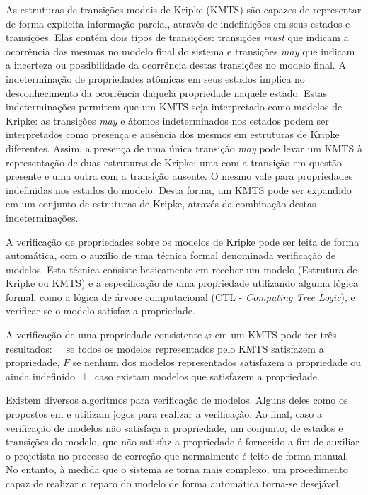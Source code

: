 \documentclass[normaltoc,capchap,capsec,times]{abnt}
\begin{document}
As estruturas de transições modais de Kripke (KMTS) são capazes de representar de forma explícita informação parcial, através de indefinições em seus estados e transições. Elas contém dois tipos de transições: transições \textit{must} que indicam a ocorrência das mesmas no modelo final do sistema e transições \textit{may} que indicam a incerteza ou possibilidade da ocorrência destas transições no modelo final. A  indeterminação de propriedades atômicas em seus estados implica no desconhecimento da ocorrência daquela propriedade naquele estado.  Estas indeterminações permitem que um KMTS seja interpretado como modelos de Kripke: as transições \textit{may} e átomos indeterminados nos estados podem ser interpretados como presença e ausência dos mesmos em estruturas de Kripke diferentes. Assim, a presença de uma única transição \textit{may} pode levar um KMTS à representação de duas estruturas de Kripke: uma com a transição em questão presente e uma outra com a transição ausente. O mesmo vale para propriedades indefinidas nos estados do modelo. Desta forma, um KMTS pode ser expandido em um conjunto de estruturas de Kripke, através da combinação destas indeterminações.


A verificação de propriedades sobre os modelos de Kripke pode ser feita de forma automática, com o auxilio de uma técnica formal denominada verificação de modelos. Esta técnica consiste basicamente em receber um modelo (Estrutura de Kripke ou KMTS) e a especificação de uma propriedade utilizando alguma lógica formal, como a lógica de árvore computacional (CTL - \textit{Computing Tree Logic}), e verificar se o modelo satisfaz a propriedade. 

A verificação de uma propriedade consistente $\varphi$ em um KMTS pode ter três resultados: $\top$ se todos os modelos representados pelo KMTS satisfazem a propriedade, $F$ se nenhum dos modelos representados satisfazem a propriedade ou ainda indefinido $\perp$  caso existam modelos que satisfazem a propriedade. %

Existem diversos algoritmos para verificação de modelos. Alguns deles como os propostos em \cite{grumbergalg} e \cite{grumberglosing} utilizam jogos para realizar a verificação. Ao final, caso a verificação de modelos não satisfaça a propriedade, um  conjunto, de estados e transições do modelo, que não satisfaz a propriedade é fornecido a fim de auxiliar o projetista no processo de correção que normalmente é feito de forma manual. No entanto, à medida que o sistema se torna mais complexo, um procedimento capaz de realizar o reparo do modelo de forma automática torna-se desejável.
\end{document}
